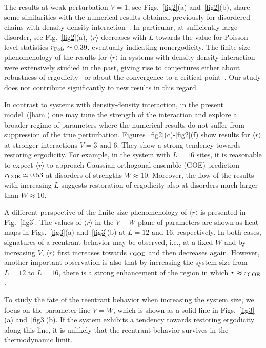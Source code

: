 \documentclass[twocolumn,pre,superscriptaddress,10pt,aps,floatfix]{revtex4-1}
\begin{document}
The results at weak perturbation $V=1$, see Figs.~\ref{fig2}(a) and~\ref{fig2}(b), share some similarities with the numerical results obtained previously for disordered chains with density-density interaction~\cite{luitz15,bertrand_garcia_16,Husex2017, suntajs_2020, sierant_prl_2020}.
In particular, at sufficiently large disorder, see Fig.~\ref{fig2}(a), $\langle r \rangle$ decreases with $L$ towards the value for Poisson level statistics $r_{\rm Pois}\simeq 0.39$, eventually indicating nonergodicity.
The finite-size phenomenology of the results for $\langle r \rangle$ in systems with density-density interaction were extensively studied in the past, giving rise to conjectures either about robustness of ergodicity~\cite{suntajs_2020} or about the convergence to a critical point~\cite{sierant_prl_2020}.
Our study does not contribute significantly to new results in this regard.

In contrast to systems with density-density interaction, in the present model~(\ref{ham}) one may tune the strength of the interaction and explore a broader regime of parameters where the numerical results do not suffer from suppression of the true perturbation.  
Figures~\ref{fig2}(c)-\ref{fig2}(f) show results for $\langle r \rangle$ at stronger interactions $V=3$ and 6. 
They show a strong tendency towards restoring ergodicity.
For example, in the system with $L=16$ sites, it is reasonable to expect $\langle r \rangle$ to approach Gaussian orthogonal ensemble (GOE) prediction $r_{\rm GOE}\simeq 0.53$ at disorders of strengths $W \approx 10$.
Moreover, the flow of the results with increasing $L$ suggests restoration of ergodicity also at disorders much larger than $W \approx 10$.

A different perspective of the finite-size phenomenology of $\langle r \rangle$ is presented in Fig.~\ref{fig3}.
The values of $\langle r \rangle$ in the $V-W$ plane of parameters are shown as heat maps in Figs.~\ref{fig3}(a) and~\ref{fig3}(b) at $L=12$ and 16, respectively.
In both cases, signatures of a reentrant behavior may be observed, i.e., at a fixed $W$ and by increasing $V$, $\langle r \rangle$ first increases towards $r_{\rm GOE}$ and then decreases again.
However, another important observation is also that by increasing the system size from $L=12$ to $L=16$, there is a strong enhancement of the region in which $r \approx r_{\rm GOE}$.

To study the fate of the reentrant behavior when increasing the system size, we focus on the parameter line $V=W$, which is shown as a solid line in Figs.~\ref{fig3}(a) and~\ref{fig3}(b).
If the system exhibits a tendency towards restoring ergodicity along this line, it is unlikely that the reentrant behavior survives in the thermodynamic limit.
\end{document}
